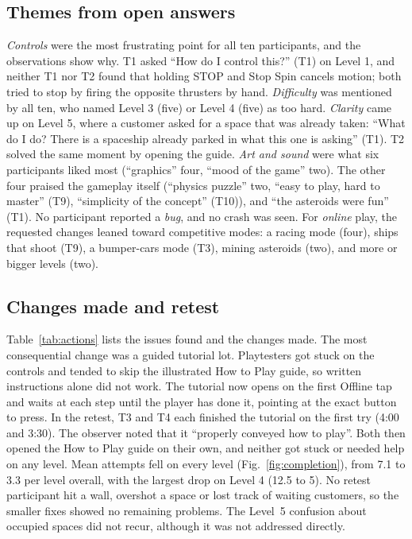 \documentclass[conference]{IEEEtran}
\begin{document}
\subsection{Themes from open answers}
\textit{Controls} were the most frustrating point for all ten participants, and the observations show why. T1 asked ``How do I control this?'' (T1) on Level 1, and neither T1 nor T2 found that holding STOP and Stop Spin cancels motion; both tried to stop by firing the opposite thrusters by hand. \textit{Difficulty} was mentioned by all ten, who named Level 3 (five) or Level 4 (five) as too hard. \textit{Clarity} came up on Level 5, where a customer asked for a space that was already taken: ``What do I do? There is a spaceship already parked in what this one is asking'' (T1). T2 solved the same moment by opening the guide. \textit{Art and sound} were what six participants liked most (``graphics'' four, ``mood of the game'' two). The other four praised the gameplay itself (``physics puzzle'' two, ``easy to play, hard to master'' (T9), ``simplicity of the concept'' (T10)), and ``the asteroids were fun'' (T1). No participant reported a \textit{bug}, and no crash was seen. For \textit{online} play, the requested changes leaned toward competitive modes: a racing mode (four), ships that shoot (T9), a bumper-cars mode (T3), mining asteroids (two), and more or bigger levels (two).

\subsection{Changes made and retest}
Table~\ref{tab:actions} lists the issues found and the changes made. The most consequential change was a guided tutorial lot. Playtesters got stuck on the controls and tended to skip the illustrated How to Play guide, so written instructions alone did not work. The tutorial now opens on the first Offline tap and waits at each step until the player has done it, pointing at the exact button to press. In the retest, T3 and T4 each finished the tutorial on the first try (4:00 and 3:30). The observer noted that it ``properly conveyed how to play''. Both then opened the How to Play guide on their own, and neither got stuck or needed help on any level. Mean attempts fell on every level (Fig.~\ref{fig:completion}), from 7.1 to 3.3 per level overall, with the largest drop on Level 4 (12.5 to 5). No retest participant hit a wall, overshot a space or lost track of waiting customers, so the smaller fixes showed no remaining problems. The Level~5 confusion about occupied spaces did not recur, although it was not addressed directly.
\end{document}
